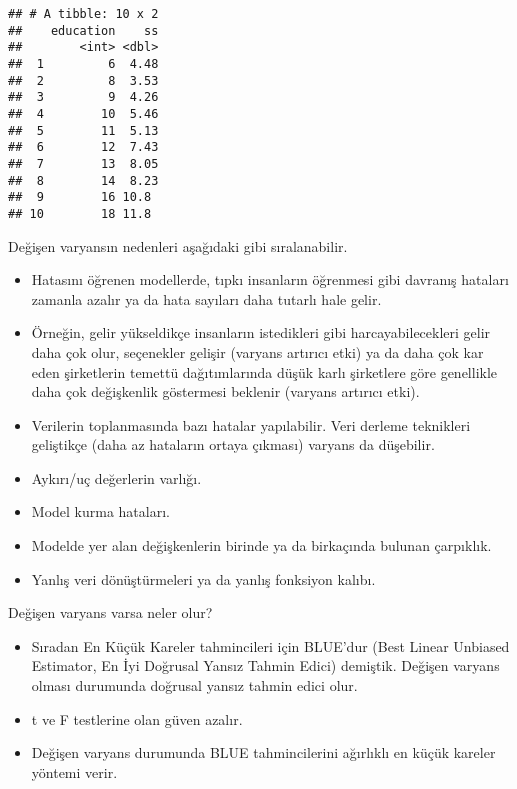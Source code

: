 \documentclass[
]{book}
\newenvironment{Shaded}{\begin{snugshade}}{\end{snugshade}}
\newcommand{\CommentTok}[1]{\textcolor[rgb]{0.56,0.35,0.01}{\textit{#1}}}
\newcommand{\DataTypeTok}[1]{\textcolor[rgb]{0.13,0.29,0.53}{#1}}
\newcommand{\DecValTok}[1]{\textcolor[rgb]{0.00,0.00,0.81}{#1}}
\newcommand{\KeywordTok}[1]{\textcolor[rgb]{0.13,0.29,0.53}{\textbf{#1}}}
\newcommand{\NormalTok}[1]{#1}
\newcommand{\OperatorTok}[1]{\textcolor[rgb]{0.81,0.36,0.00}{\textbf{#1}}}
\newcommand{\StringTok}[1]{\textcolor[rgb]{0.31,0.60,0.02}{#1}}
\begin{document}
\begin{Shaded}
\end{Shaded}

\begin{verbatim}
## # A tibble: 10 x 2
##    education    ss
##        <int> <dbl>
##  1         6  4.48
##  2         8  3.53
##  3         9  4.26
##  4        10  5.46
##  5        11  5.13
##  6        12  7.43
##  7        13  8.05
##  8        14  8.23
##  9        16 10.8 
## 10        18 11.8
\end{verbatim}

Değişen varyansın nedenleri aşağıdaki gibi sıralanabilir.

\begin{itemize}
\item
  Hatasını öğrenen modellerde, tıpkı insanların öğrenmesi gibi davranış hataları zamanla azalır ya da hata sayıları daha tutarlı hale gelir.
\item
  Örneğin, gelir yükseldikçe insanların istedikleri gibi harcayabilecekleri gelir daha çok olur, seçenekler gelişir (varyans artırıcı etki) ya da daha çok kar eden şirketlerin temettü dağıtımlarında düşük karlı şirketlere göre genellikle daha çok değişkenlik göstermesi beklenir (varyans artırıcı etki).
\item
  Verilerin toplanmasında bazı hatalar yapılabilir. Veri derleme teknikleri geliştikçe (daha az hataların ortaya çıkması) varyans da düşebilir.
\item
  Aykırı/uç değerlerin varlığı.
\item
  Model kurma hataları.
\item
  Modelde yer alan değişkenlerin birinde ya da birkaçında bulunan çarpıklık.
\item
  Yanlış veri dönüştürmeleri ya da yanlış fonksiyon kalıbı.
\end{itemize}

Değişen varyans varsa neler olur?

\begin{itemize}
\item
  Sıradan En Küçük Kareler tahmincileri için BLUE'dur (Best Linear Unbiased Estimator, En İyi Doğrusal Yansız Tahmin Edici) demiştik. Değişen varyans olması durumunda doğrusal yansız tahmin edici olur.
\item
  t ve F testlerine olan güven azalır.
\item
  Değişen varyans durumunda BLUE tahmincilerini ağırlıklı en küçük kareler yöntemi verir.
\end{itemize}
\end{document}
